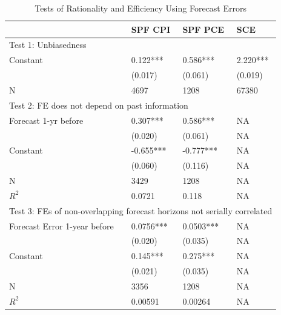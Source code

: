 \documentclass[12pt]{article}
\begin{document}
	\begin{table}[p]
		\caption{Tests of Rationality and Efficiency Using Forecast Errors}
		\label{NullTestTable}
		\centering 
		\begin{tabular}{llll}
			\hline 
			& SPF CPI          & SPF PCE          & SCE            \\
			\hline 
			\multicolumn{4}{l}{Test 1: Unbiasedness}                                                           \\
			\hline 
			Constant                            & 0.122***         & 0.586***         & 2.220***       \\
			& (0.017)          & (0.061)          & (0.019)        \\
			\hline 
			N                                   & 4697             & 1208             & 67380          \\
			\hline 
			\multicolumn{4}{l}{Test 2: FE does not depend on past information}                                  \\
			\hline 
			Forecast 1-yr before                & 0.307***         & 0.586***         & NA             \\
			& (0.020)          & (0.061)          & NA             \\
			Constant                            & -0.655***        & -0.777***        & NA             \\
			& (0.060)          & (0.116)          & NA             \\
			\hline 
			N                                   & 3429             & 1208             & NA             \\
			$R^2$                 & 0.0721           & 0.118            & NA             \\
			\hline 
			\multicolumn{4}{l}{Test 3: FEs of non-overlapping forecast horizons not serially correlated} \\
			\hline 
			Forecast Error 1-year before        & 0.0756***        & 0.0503***        & NA             \\
			& (0.020)          & (0.035)          & NA             \\
			Constant                            & 0.145***         & 0.275***         & NA             \\
			& (0.021)          & (0.035)          & NA             \\
			\hline 
			N                                   & 3356             & 1208             & NA             \\
			$R^2$                   & 0.00591          & 0.00264          & NA             \\

\end{tabular}
\end{table}
\end{document}
